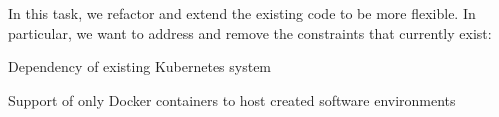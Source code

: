 \begin{task}[
  title=Reducing technical constraints for broader usage,
  id=constraints,
  lead=SRL,
  PM=1,
  wphases={0-36},
  partners={MP}
]

In this task, we refactor and extend the existing code to be more flexible. In
particular, we want to address and remove the constraints that currently exist:

\begin{compactitem}
  \item Dependency of existing Kubernetes system
  \item Support of only Docker containers to host created software environments
  \end{compactitem}

\end{task}
